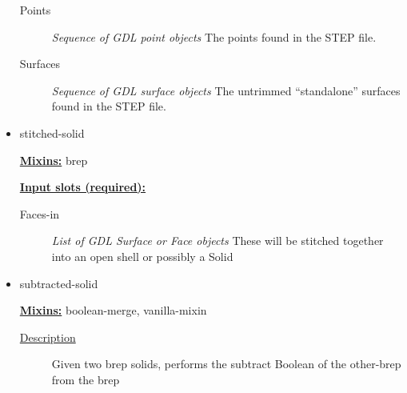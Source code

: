 \documentclass [11pt]{book}
\begin{document}
\begin{itemize}
\begin{description}
\item [Points]
\emph{Sequence of GDL point objects} The points found in the STEP file.


\item [Surfaces]
\emph{Sequence of GDL surface objects} The untrimmed ``standalone'' surfaces found in the STEP file.


\end{description}







\item {}stitched-solid


\textbf{
\underline{Mixins:}} brep





\begin{description}

\end{description}








\textbf{
\underline{Input slots (required):}}

\begin{description}

\item [Faces-in]
\emph{List of GDL Surface or Face objects} These will be stitched together into an open shell or possibly a Solid


\end{description}







\item {}subtracted-solid


\textbf{
\underline{Mixins:}} boolean-merge, vanilla-mixin





\begin{description}

\item [
\underline{Description}]


Given two brep solids, performs the subtract Boolean of the other-brep from the brep




\end{description}
\end{itemize}
\end{document}
